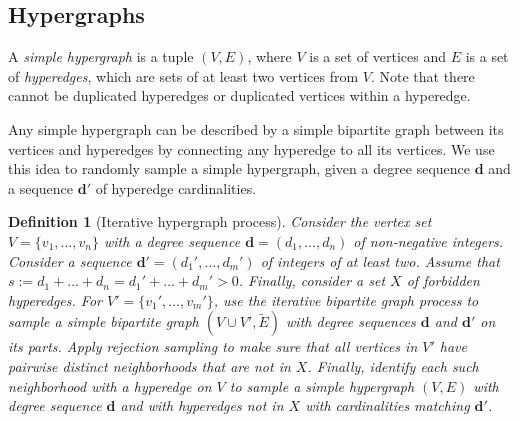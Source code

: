 \documentclass{article}
\theoremstyle{plain}
\theoremstyle{remark}
\theoremstyle{plain}
\newtheorem{definition}[theorem]{Definition}
\numberwithin{equation}{section}
\renewcommand{\d}{{\boldsymbol{d}}}
\begin{document}
	\subsection{Hypergraphs}\label{subsection_results_hyper}
	
	A \emph{simple hypergraph} is a tuple $(V,E)$, where $V$ is a set of vertices and $E$ is a set of \emph{hyperedges}, which are sets of at least two vertices from $V$. Note that there cannot be duplicated hyperedges or duplicated vertices within a hyperedge.
	
	Any simple hypergraph can be described by a simple bipartite graph between its vertices and hyperedges by connecting any hyperedge to all its vertices. We use this idea to randomly sample a simple hypergraph, given a degree sequence $\d$ and a sequence $\d'$ of hyperedge cardinalities.
	
	\begin{definition}[Iterative hypergraph process]
		Consider the vertex set $V=\{v_1,\ldots,v_n\}$ with a degree sequence $\d=(d_1,\ldots,d_n)$ of non-negative integers. Consider a sequence $\d'=(d_1',\ldots,d_m')$ of integers of at least two. Assume that $s:=d_1+\ldots+d_n=d_1'+\ldots+d_m'>0$. Finally, consider a set $X$ of forbidden hyperedges. For $V'=\{v_1',\ldots,v_m'\}$, use the iterative bipartite graph process to sample a simple bipartite graph $(V\cup V',\widetilde{E})$ with degree sequences $\d$ and $\d'$ on its parts. Apply rejection sampling to make sure that all vertices in $V'$ have pairwise distinct neighborhoods that are not in $X$. Finally, identify each such neighborhood with a hyperedge on $V$ to sample a simple hypergraph $(V,E)$ with degree sequence $\d$ and with hyperedges not in $X$ with cardinalities matching $\d'$.
	\end{definition}
	
\end{document}
